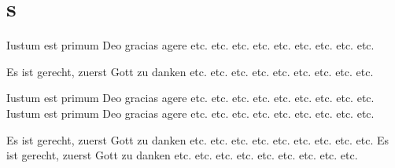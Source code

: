 \documentclass{book}
\begin{document}
\section{s}




\begin{pairs}

\begin{Leftside}
\beginnumbering
\pstart

Iustum est primum Deo gracias agere etc. etc. etc. etc. etc. etc. etc. etc. etc. 
\pend
\endnumbering
\end{Leftside}

\begin{Rightside}
\beginnumbering
\pstart
Es ist gerecht, zuerst Gott zu danken etc. etc. etc. etc. etc. etc. etc. etc. etc. 
\pend
\endnumbering
\end{Rightside}

\end{pairs}
\Columns

\begin{pages}

\begin{Leftside}
\beginnumbering
\pstart
Iustum est primum Deo gracias agere etc. etc. etc. etc. etc. etc. etc. etc. etc. 
Iustum est primum Deo gracias agere etc. etc. etc. etc. etc. etc. etc. etc. etc. 
\pend
\endnumbering
\end{Leftside}

\begin{Rightside}
\beginnumbering
\pstart
Es ist gerecht, zuerst Gott zu danken etc. etc. etc. etc. etc. etc. etc. etc. etc. 
Es ist gerecht, zuerst Gott zu danken etc. etc. etc. etc. etc. etc. etc. etc. etc. 
\pend
\endnumbering
\end{Rightside}

\end{pages}
\Pages
\end{document}
